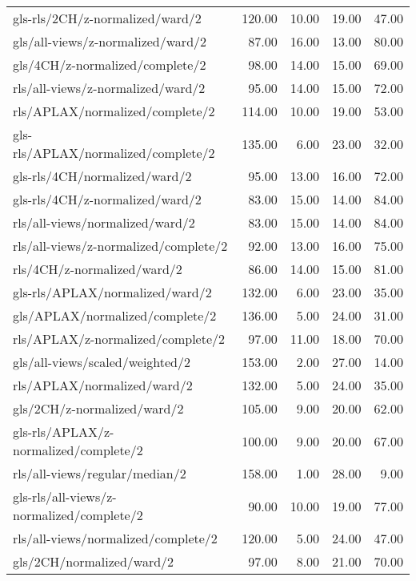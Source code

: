 \begin{longtable}{lrrrr}
    gls-rls/2CH/z-normalized/ward/2           & 120.00 & 10.00 & 19.00 & 47.00 \\
    gls/all-views/z-normalized/ward/2         &  87.00 & 16.00 & 13.00 & 80.00 \\
    gls/4CH/z-normalized/complete/2           &  98.00 & 14.00 & 15.00 & 69.00 \\
    rls/all-views/z-normalized/ward/2         &  95.00 & 14.00 & 15.00 & 72.00 \\
    rls/APLAX/normalized/complete/2           & 114.00 & 10.00 & 19.00 & 53.00 \\
    gls-rls/APLAX/normalized/complete/2       & 135.00 &  6.00 & 23.00 & 32.00 \\
    gls-rls/4CH/normalized/ward/2             &  95.00 & 13.00 & 16.00 & 72.00 \\
    gls-rls/4CH/z-normalized/ward/2           &  83.00 & 15.00 & 14.00 & 84.00 \\
    rls/all-views/normalized/ward/2           &  83.00 & 15.00 & 14.00 & 84.00 \\
    rls/all-views/z-normalized/complete/2     &  92.00 & 13.00 & 16.00 & 75.00 \\
    rls/4CH/z-normalized/ward/2               &  86.00 & 14.00 & 15.00 & 81.00 \\
    gls-rls/APLAX/normalized/ward/2           & 132.00 &  6.00 & 23.00 & 35.00 \\
    gls/APLAX/normalized/complete/2           & 136.00 &  5.00 & 24.00 & 31.00 \\
    rls/APLAX/z-normalized/complete/2         &  97.00 & 11.00 & 18.00 & 70.00 \\
    gls/all-views/scaled/weighted/2           & 153.00 &  2.00 & 27.00 & 14.00 \\
    rls/APLAX/normalized/ward/2               & 132.00 &  5.00 & 24.00 & 35.00 \\
    gls/2CH/z-normalized/ward/2               & 105.00 &  9.00 & 20.00 & 62.00 \\
    gls-rls/APLAX/z-normalized/complete/2     & 100.00 &  9.00 & 20.00 & 67.00 \\
    rls/all-views/regular/median/2            & 158.00 &  1.00 & 28.00 &  9.00 \\
    gls-rls/all-views/z-normalized/complete/2 &  90.00 & 10.00 & 19.00 & 77.00 \\
    rls/all-views/normalized/complete/2       & 120.00 &  5.00 & 24.00 & 47.00 \\
    gls/2CH/normalized/ward/2                 &  97.00 &  8.00 & 21.00 & 70.00 \\

\end{longtable}

